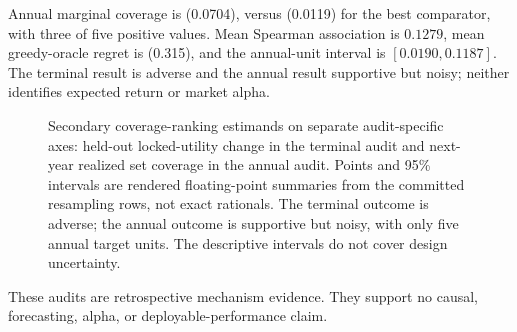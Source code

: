 Annual marginal coverage is (0.0704), versus (0.0119) for the best
comparator, with three of five positive values.  Mean Spearman association is
\(0.1279\), mean greedy-oracle regret is (0.315), and the annual-unit
interval is \([0.0190,0.1187]\).  The terminal result is adverse and the
annual result supportive but noisy; neither identifies expected return or
market alpha.

\begin{figure}[htbp]
  \centering
  
  \caption{Secondary coverage-ranking estimands on separate audit-specific
  axes: held-out locked-utility change in the terminal audit and next-year
  realized set coverage in the annual audit.  Points and 95\% intervals are
  rendered floating-point summaries from the committed resampling rows, not
  exact rationals.  The terminal outcome is adverse; the annual outcome is
  supportive but noisy, with only five annual target units.  The descriptive
  intervals do not cover design uncertainty.}
  \label{fig:supp-financial-coverage-comparison}
\end{figure}

These audits are retrospective mechanism evidence.  They support no causal,
forecasting, alpha, or deployable-performance claim.
